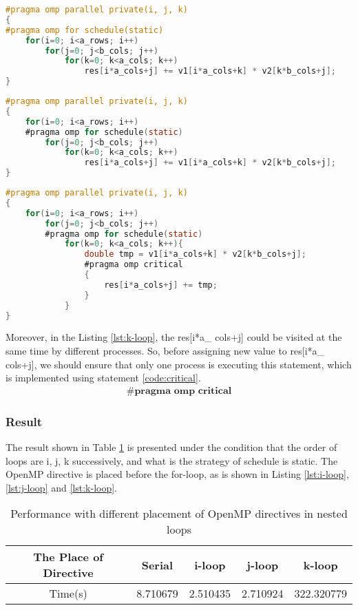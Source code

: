 \documentclass[a4paper]{article}   %
\begin{document}
\begin{CJK}{UTF8}{gbsn}
\begin{spacing}{1.2}
\begin{lstlisting}[language=C, label=lst:i-loop, caption=i-loop Paralleled]
#pragma omp parallel private(i, j, k)
{
#pragma omp for schedule(static)
    for(i=0; i<a_rows; i++)
		for(j=0; j<b_cols; j++)
            for(k=0; k<a_cols; k++)
                res[i*a_cols+j] += v1[i*a_cols+k] * v2[k*b_cols+j];
}
\end{lstlisting}

\begin{lstlisting}[language=C, label=lst:j-loop, caption=j-loop Paralleled]
#pragma omp parallel private(i, j, k)
{
    for(i=0; i<a_rows; i++)
    #pragma omp for schedule(static)
		for(j=0; j<b_cols; j++)
            for(k=0; k<a_cols; k++)
                res[i*a_cols+j] += v1[i*a_cols+k] * v2[k*b_cols+j];
}
\end{lstlisting}

\begin{lstlisting}[language=C, label=lst:k-loop, caption=k-loop Paralleled]
#pragma omp parallel private(i, j, k)
{
    for(i=0; i<a_rows; i++)
		for(j=0; j<b_cols; j++)
		#pragma omp for schedule(static)
            for(k=0; k<a_cols; k++){
            	double tmp = v1[i*a_cols+k] * v2[k*b_cols+j];
            	#pragma omp critical
            	{
                	res[i*a_cols+j] += tmp;
            	}
           	}
}
\end{lstlisting}

Moreover, in the Listing \ref{lst:k-loop}, the res[i*a\_ cols+j] could be visited at the same time by different processes. So, before assigning new value to res[i*a\_ cols+j], we should ensure that only one process is executing this statement, which is implemented using statement \ref{code:critical}.
\begin{align}
\label{code:critical}
\textbf{\# pragma omp critical}
\end{align}

\subsubsection{Result}
The result shown in Table \ref{table:prob1_res} is presented under the condition that the order of loops are i, j, k successively, and what is the strategy of schedule is static. The OpenMP directive is placed before the for-loop, as is shown in Listing \ref{lst:i-loop}, \ref{lst:j-loop} and \ref{lst:k-loop}.

\begin{table}[htbp]
\centering
\begin{tabular}{|c|c|c|c|c|}
\hline The Place of Directive & Serial & i-loop  & j-loop & k-loop \\ 
\hline Time(s) & 8.710679 & 2.510435 & 2.710924 & 322.320779 \\ 
\hline 
\end{tabular}
\caption{Performance with different placement of OpenMP directives in nested loops} \label{table:prob1_res}
\end{table}



\end{spacing}
\end{CJK}
\end{document}
